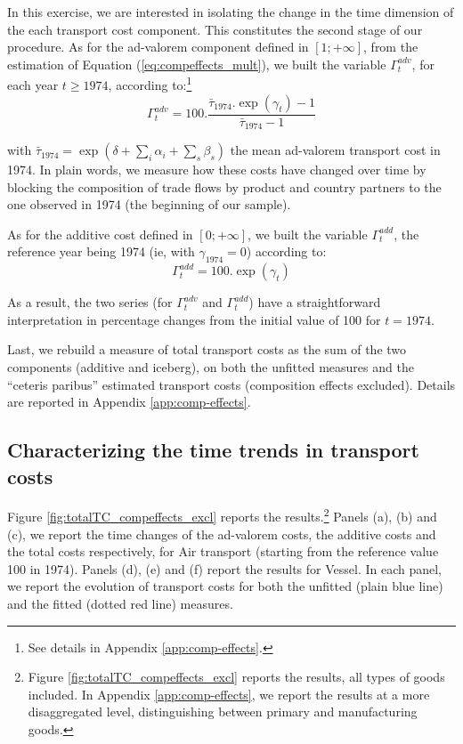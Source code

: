 \documentclass[a4paper,11pt]{article}
\begin{document}
In this exercise, we are interested in isolating the change in the time dimension of the each transport cost component. This constitutes the second stage of our procedure. As for the ad-valorem component defined in $[1;+\infty]$, from the estimation of Equation (\ref{eq:compeffects_mult}), we built the variable $\Gamma^{adv}_t$, for each year $t\geq 1974$, according to:\footnote{See details in Appendix \ref{app:comp-effects}.}
\begin{equation}
\Gamma^{adv}_t = 100.\frac {\bar{\tau}_{1974}.\exp(\gamma_t)-1} {\bar{\tau}_{1974}-1} \label{eq:comp_effects_adv}
\end{equation}

\noindent with $\bar{\tau}_{1974} = \exp(\delta +\sum_i \alpha_i +\sum_s \beta_s)$ the mean ad-valorem transport cost in 1974. In plain words, we measure how these costs have changed over time by blocking the composition of trade flows by product and country partners to the one observed in 1974 (the beginning of our sample).

As for the additive cost defined in $[0;+\infty]$, we built the variable $\Gamma^{add}_t$, the reference year being 1974 (ie, with $\gamma_{1974}=0$) according to:
\begin{equation}
\Gamma^{add}_t = 100.\exp(\gamma_t) \label{eq:comp_effects_add}
\end{equation}

\noindent As a result, the two series (for $\Gamma^{adv}_t$ and $\Gamma^{add}_t$) have a straightforward interpretation in percentage changes from the initial value of 100 for $t=1974$.

Last, we rebuild a measure of total transport costs as the sum of the two components (additive and iceberg), on both the unfitted measures  and the ``ceteris paribus'' estimated transport costs (composition effects excluded). Details are reported in Appendix \ref{app:comp-effects}.


\subsection{Characterizing the time trends in transport costs}
Figure \ref{fig:totalTC_compeffects_excl} reports the results.\footnote{Figure \ref{fig:totalTC_compeffects_excl} reports the results, all types of goods included. In Appendix \ref{app:comp-effects}, we report the results at a more disaggregated level, distinguishing between primary and manufacturing goods.} Panels (a), (b) and (c), we report the time changes of the ad-valorem costs, the additive costs and the total costs respectively, for Air transport (starting from the reference value 100 in 1974). Panels (d), (e) and (f) report the results for Vessel. In each panel, we report the evolution of transport costs for both the unfitted (plain blue line) and the fitted (dotted red line) measures.
\end{document}
